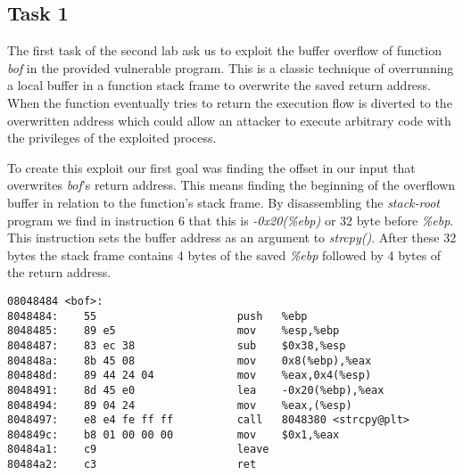 



\subsection{Task 1}
The first task of the second lab ask us to exploit the buffer overflow of function \emph{bof} in the provided vulnerable program. This is a classic technique of overrunning a local buffer in a function stack frame to overwrite the saved return address. When the function eventually tries to return the execution flow is diverted to the overwritten address which could allow an attacker to execute arbitrary code with the privileges  of the exploited process.

To create this exploit our first goal was finding the offset in our input that overwrites \emph{bof}'s return address. This means finding the beginning of the overflown buffer in relation to the function's stack frame. By disassembling the \emph{stack-root} program we find in instruction 6 that this is \emph{-0x20(\%ebp)} or 32 byte before \emph{\%ebp}. This instruction sets the buffer address as an argument to \emph{strcpy()}. After these 32 bytes the stack frame contains 4 bytes of the saved \emph{\%ebp} followed by 4 bytes of the return address.

\begin{minipage}{\linewidth}
\begin{lstlisting}[caption={bof function disassembly},
frame=single]
08048484 <bof>:
8048484:	55                   	push   %ebp
8048485:	89 e5                	mov    %esp,%ebp
8048487:	83 ec 38             	sub    $0x38,%esp
804848a:	8b 45 08             	mov    0x8(%ebp),%eax
804848d:	89 44 24 04          	mov    %eax,0x4(%esp)
8048491:	8d 45 e0             	lea    -0x20(%ebp),%eax
8048494:	89 04 24             	mov    %eax,(%esp)
8048497:	e8 e4 fe ff ff       	call   8048380 <strcpy@plt>
804849c:	b8 01 00 00 00       	mov    $0x1,%eax
80484a1:	c9                   	leave
80484a2:	c3                   	ret
\end{lstlisting}
\end{minipage}

